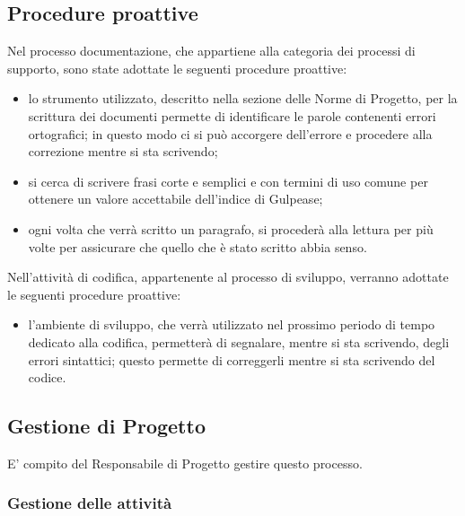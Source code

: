 \subsection{Procedure proattive}
Nel processo documentazione, che appartiene alla categoria dei processi di supporto, sono state adottate le seguenti procedure proattive:
\begin{itemize}
\item {}lo strumento utilizzato, descritto nella sezione delle Norme di Progetto, per la scrittura dei documenti permette di identificare le parole contenenti errori ortografici; in questo modo ci si può accorgere dell'errore e procedere alla correzione mentre si sta scrivendo;
\item {}si cerca di scrivere frasi corte e semplici e con termini di uso comune per ottenere un valore accettabile dell'indice di Gulpease;
\item {}ogni volta che verrà scritto un paragrafo, si procederà alla lettura per più volte per assicurare che quello che è stato scritto abbia senso.
\end{itemize}
Nell'attività di codifica, appartenente al processo di sviluppo, verranno adottate le seguenti procedure proattive:
\begin{itemize}
\item {}l'ambiente di sviluppo, che verrà utilizzato nel prossimo periodo di tempo dedicato alla codifica, permetterà di segnalare, mentre si sta scrivendo, degli errori sintattici; questo permette di correggerli mentre si sta scrivendo del codice.
\end{itemize}

\subsection{Gestione di Progetto}
E' compito del Responsabile di Progetto gestire questo processo.
\label{}

\subsubsection{Gestione delle attività}
\label{}

